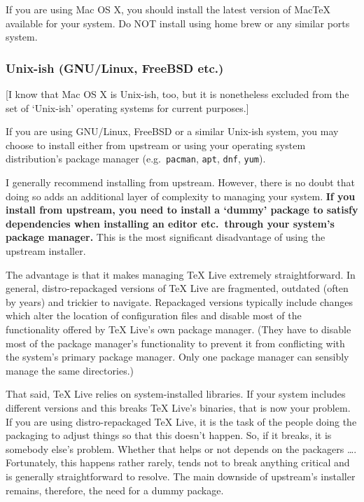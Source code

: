 If you are using Mac OS X, you should install the latest version of Mac\TeX{} available for your system.
Do NOT install using home brew or any similar ports system.

\subsubsection<1-| beamer:0>{Unix-ish (GNU/Linux, FreeBSD etc.)}

[I know that Mac OS X is Unix-ish, too, but it is nonetheless excluded from the set of ‘Unix-ish’ operating systems for current purposes.]

If you are using GNU/Linux, FreeBSD or a similar Unix-ish system, you may choose to install either from upstream or using your operating system distribution's package manager (e.g.~\texttt{pacman}, \texttt{apt}, \texttt{dnf}, \texttt{yum}).

I generally recommend installing from upstream.
However, there is no doubt that doing so adds an additional layer of complexity to managing your system.
\textbf{If you install from upstream, you need to install a ‘dummy’ package to satisfy dependencies when installing an editor etc.\ through your system's package manager.}
This is the most significant disadvantage of using the upstream installer.

The advantage is that it makes managing \TeX{} Live extremely straightforward.
In general, distro-repackaged versions of \TeX{} Live are fragmented, outdated (often by years) and trickier to navigate.
Repackaged versions typically include changes which alter the location of configuration files and disable most of the functionality offered by \TeX{} Live's own package manager. 
(They have to disable most of the package manager's functionality to prevent it from conflicting with the system's primary package manager.
Only one package manager can sensibly manage the same directories.)

That said, \TeX{} Live relies on system-installed libraries.
If your system includes different versions and this breaks \TeX{} Live's binaries, that is now your problem.
If you are using distro-repackaged \TeX{} Live, it is the task of the people doing the packaging to adjust things so that this doesn't happen.
So, if it breaks, it is somebody else's problem. 
Whether that helps or not depends on the packagers \dots. 
Fortunately, this happens rather rarely, tends not to break anything critical and is generally straightforward to resolve.
The main downside of upstream's installer remains, therefore, the need for a dummy package.

